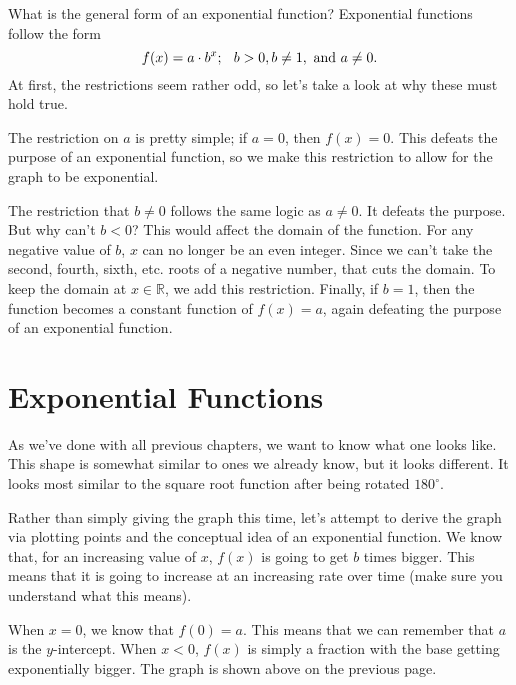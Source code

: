 \documentclass[lang=en,11pt]{elegantbook}
\begin{document}
What is the general form of an exponential function?  Exponential functions follow the form $$f(x)=a\cdot b^x; \hspace{0.10in} b>0, b\neq 1, \text{ and } a\neq 0.$$
At first, the restrictions seem rather odd, so let's take a look at why these must hold true.

The restriction on $a$ is pretty simple; if $a=0$, then $f(x)=0$.  This defeats the purpose of an exponential function, so we make this restriction to allow for the graph to be exponential.

The restriction that $b\neq 0$ follows the same logic as $a\neq 0$.  It defeats the purpose.  But why can't $b<0$?  This would affect the domain of the function.  For any negative value of $b$, $x$ can no longer be an even integer.  Since we can't take the second, fourth, sixth, etc.  roots of a negative number, that cuts the domain.  To keep the domain at $x\in\mathbb{R}$, we add this restriction.  Finally, if $b=1$, then the function becomes a constant function of $f(x)=a$, again defeating the purpose of an exponential function.

\section{Exponential Functions}
\begin{wrapfigure}{r}{4cm}
\end{wrapfigure}

\noindent As we've done with all previous chapters, we want to know what one looks like.  This shape is somewhat similar to ones we already know, but it looks different.  It looks most similar to the square root function after being rotated $180^{\circ}$.  

Rather than simply giving the graph this time, let's attempt to derive the graph via plotting points and the conceptual idea of an exponential function.  We know that, for an increasing value of $x$, $f(x)$ is going to get $b$ times bigger.  This means that it is going to increase at an increasing rate over time (make sure you understand what this means).

When $x=0$, we know that $f(0)=a$.  This means that we can remember that $a$ is the $y$-intercept.  When $x<0$, $f(x)$ is simply a fraction with the base getting exponentially bigger.  The graph is shown above on the previous page.
\end{document}
